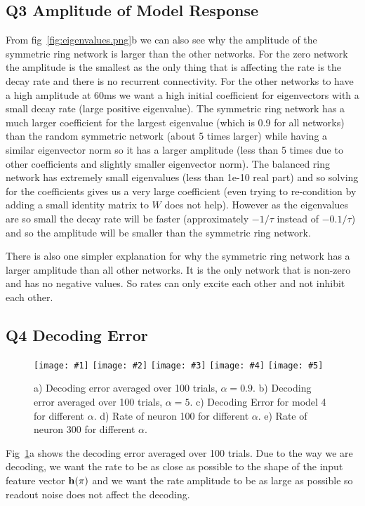 \documentclass[a4paper, 11pt, oneside]{report}
\newcommand{\centreImageFive}[6]{
    \begin{figure}
        \centering
        \texttt{[image: \#1]}
        \texttt{[image: \#2]}
        \texttt{[image: \#3]}
        \texttt{[image: \#4]}
        \texttt{[image: \#5]}
        \caption{#6}
        \label{fig:#1}
    \end{figure}
}
\begin{document}
\subsection*{Q3 Amplitude of Model Response}

From fig~\ref{fig:eigenvalues.png}b we can also see why the amplitude of the symmetric ring network is larger than the other networks.
For the zero network the amplitude is the smallest as the only thing that is affecting the rate is the decay rate and there is no recurrent connectivity.
For the other networks to have a high amplitude at 60ms we want a high initial coefficient for eigenvectors with a small decay rate (large positive eigenvalue).
The symmetric ring network has a much larger coefficient for the largest eigenvalue (which is 0.9 for all networks) than the random symmetric network (about 5 times larger)
while having a similar eigenvector norm so it has a larger amplitude (less than 5 times due to other coefficients and slightly smaller eigenvector norm).
The balanced ring network has extremely small eigenvalues (less than 1e-10 real part) and so solving for the coefficients gives us a very large coefficient (even trying to re-condition by adding a small identity matrix to $W$ does not help).
However as the eigenvalues are so small the decay rate will be faster (approximately $-1/\tau$ instead of $-0.1/\tau$) and so the amplitude will be smaller than the symmetric ring network.

There is also one simpler explanation for why the symmetric ring network has a larger amplitude than all other networks.
It is the only network that is non-zero and has no negative values. So rates can only excite each other and not inhibit each other.

\subsection*{Q4 Decoding Error}

\centreImageFive{error.png}{error_alpha_5.png}{error_alpha.png}{model_4_rate_alpha.png}{model_4_rate_alpha_300.png}{a) Decoding error averaged over 100 trials, $\alpha=0.9$. b) Decoding error averaged over 100 trials, $\alpha=5$.
c) Decoding Error for model 4 for different $\alpha$. d) Rate of neuron 100 for different $\alpha$. e) Rate of neuron 300 for different $\alpha$.}

Fig~\ref{fig:error.png}a shows the decoding error averaged over 100 trials. Due to the way we are decoding,
we want the rate to be as close as possible to the shape of the input feature vector $\mathbf{h}(\pi)$ and we want 
the rate amplitude to be as large as possible so readout noise does not affect the decoding.
\end{document}
